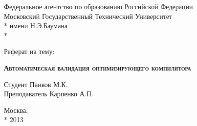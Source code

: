 \begin{titlepage}
    \newpage
    
    \begin{center}
        Федеральное агентство по образованию Российской Федерации \\
        Московский Государственный Технический Университет \\*
        имени Н.Э.Баумана \\*
        \vspace{-12mm}
        \begin{figure}[h]
        \end{figure}
        \vspace{-16mm}
        \hrulefill
    \end{center}
    \begin{center}
        \Large Реферат на тему:
    \end{center}
    
    \vspace{2.5em}
    
    \begin{center}
        \textsc{\textbf{Автоматическая валидация оптимизирующего компилятора}}
    \end{center}
    
    \vspace{6em}
    
    \begin{flushleft}
        \hspace{8.5cm}Студент \hrulefill Панков М.К. \\
        \vspace{1.5em}
        \hspace{8.5cm}Преподаватель \hrulefill Карпенко А.П.\\
    \end{flushleft}
    
    \vspace{\fill}
    
    \begin{center}
        Москва, \\*
        2013
    \end{center}

\end{titlepage}